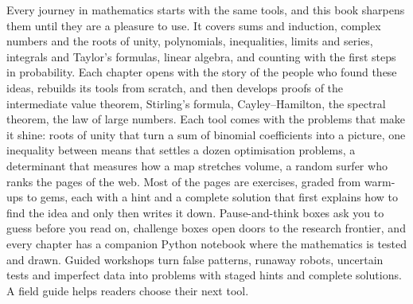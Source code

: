 Every journey in mathematics starts with the same tools, and this book sharpens them until they are a pleasure to use.
It covers sums and induction, complex numbers and the roots of unity, polynomials, inequalities, limits and series,
integrals and Taylor's formulas, linear algebra, and counting with the first steps in probability. Each chapter opens with
the story of the people who found these ideas, rebuilds its tools from scratch, and then develops proofs of the
intermediate value theorem, Stirling's formula, Cayley--Hamilton, the spectral theorem, the law of large numbers.
Each tool comes with the problems that make it shine: roots of unity that turn a sum of binomial coefficients into a picture,
one inequality between means that settles a dozen optimisation problems, a determinant that measures how a map stretches
volume, a random surfer who ranks the pages of the web. Most of the pages are exercises, graded from warm-ups to gems,
each with a hint and a complete solution that first explains how to find the idea and only then writes it down.
Pause-and-think boxes ask you to guess before you read on, challenge boxes open doors to the research frontier, and every
chapter has a companion Python notebook where the mathematics is tested and drawn. Guided workshops turn false patterns, runaway robots, uncertain tests and imperfect data into problems with staged hints and complete solutions. A field guide helps readers choose their next tool.

